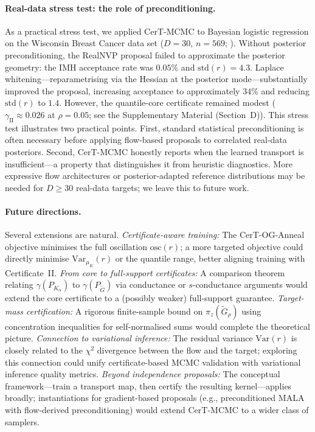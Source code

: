 \documentclass[12pt]{article}
\newcommand{\osc}{\mathrm{osc}}
\begin{document}
\paragraph{Real-data stress test: the role of preconditioning.}
As a practical stress test, we applied CerT-MCMC to Bayesian logistic regression on the Wisconsin Breast Cancer data set ($D = 30$, $n = 569$; \citealt{StreetWolbergMangasarian1993}).
Without posterior preconditioning, the RealNVP proposal failed to approximate the posterior geometry: the IMH acceptance rate was $0.05\%$ and $\mathrm{std}(r) = 4.3$.
Laplace whitening---reparametrising via the Hessian at the posterior mode---substantially improved the proposal, increasing acceptance to approximately $34\%$ and reducing $\mathrm{std}(r)$ to $1.4$.
However, the quantile-core certificate remained modest ($\gamma_{\mathrm{II}} \approx 0.026$ at $\rho = 0.05$; see the Supplementary Material (Section~D)).
This stress test illustrates two practical points.
First, standard statistical preconditioning is often necessary before applying flow-based proposals to correlated real-data posteriors.
Second, CerT-MCMC honestly reports when the learned transport is insufficient---a property that distinguishes it from heuristic diagnostics.
More expressive flow architectures or posterior-adapted reference distributions may be needed for $D \ge 30$ real-data targets; we leave this to future work.

\paragraph{Future directions.}
Several extensions are natural.
\emph{Certificate-aware training:}
The CerT-OG-Anneal objective minimises the full oscillation $\osc(r)$; a more targeted objective could directly minimise $\mathrm{Var}_{\mu_K}(r)$ or the quantile range, better aligning training with Certificate~II.
\emph{From core to full-support certificates:}
A comparison theorem relating $\gamma(P_{K_\alpha})$ to $\gamma(P_{\tilde{G}})$ via conductance or $s$-conductance arguments would extend the core certificate to a (possibly weaker) full-support guarantee.
\emph{Target-mass certification:}
A rigorous finite-sample bound on $\pi_z(\tilde{G}_\rho)$ using concentration inequalities for self-normalised sums would complete the theoretical picture.
\emph{Connection to variational inference:}
The residual variance $\mathrm{Var}(r)$ is closely related to the $\chi^2$ divergence between the flow and the target; exploring this connection could unify certificate-based MCMC validation with variational inference quality metrics.
\emph{Beyond independence proposals:}
The conceptual framework---train a transport map, then certify the resulting kernel---applies broadly; instantiations for gradient-based proposals (e.g., preconditioned MALA with flow-derived preconditioning) would extend CerT-MCMC to a wider class of samplers.
\end{document}
